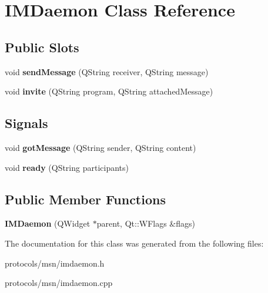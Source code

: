 \hypertarget{classIMDaemon}{
\section{IMDaemon Class Reference}
\label{classIMDaemon}
}
\subsection*{Public Slots}
\begin{DoxyCompactItemize}
\item 
\hypertarget{classIMDaemon_a81626921b3a41a0fec35b72855487032}{
void {\bfseries sendMessage} (QString receiver, QString message)}
\label{classIMDaemon_a81626921b3a41a0fec35b72855487032}

\item 
\hypertarget{classIMDaemon_af23e4b8578343cc3610bdfae13c96244}{
void {\bfseries invite} (QString program, QString attachedMessage)}
\label{classIMDaemon_af23e4b8578343cc3610bdfae13c96244}

\end{DoxyCompactItemize}
\subsection*{Signals}
\begin{DoxyCompactItemize}
\item 
\hypertarget{classIMDaemon_af730c723252e6d5713e14ba70f9b2bc6}{
void {\bfseries gotMessage} (QString sender, QString content)}
\label{classIMDaemon_af730c723252e6d5713e14ba70f9b2bc6}

\item 
\hypertarget{classIMDaemon_a2b1a5a17d2e8ad46419af5eb1d31056d}{
void {\bfseries ready} (QString participants)}
\label{classIMDaemon_a2b1a5a17d2e8ad46419af5eb1d31056d}

\end{DoxyCompactItemize}
\subsection*{Public Member Functions}
\begin{DoxyCompactItemize}
\item 
\hypertarget{classIMDaemon_a61999ba31ab441ddd45b6798ae27dbb6}{
{\bfseries IMDaemon} (QWidget $\ast$parent, Qt::WFlags \&flags)}
\label{classIMDaemon_a61999ba31ab441ddd45b6798ae27dbb6}

\end{DoxyCompactItemize}


The documentation for this class was generated from the following files:\begin{DoxyCompactItemize}
\item 
protocols/msn/imdaemon.h\item 
protocols/msn/imdaemon.cpp\end{DoxyCompactItemize}
